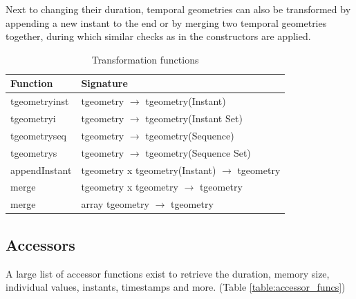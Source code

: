Next to changing their duration, temporal geometries can also be transformed by appending a new instant to the end or by merging two temporal geometries together, during which similar checks as in the constructors are applied.

\begin{table}[h!]
    \centering
    \begin{tabularx}{\textwidth}{|l|X|}
    \hline
    \textbf{Function}   & \textbf{Signature} \\ 
    \hline
    tgeometryinst       & tgeometry $\rightarrow$ tgeometry(Instant) \\
    \hline
    tgeometryi          & tgeometry $\rightarrow$ tgeometry(Instant Set) \\
    \hline
    tgeometryseq        & tgeometry $\rightarrow$ tgeometry(Sequence) \\
    \hline
    tgeometrys          & tgeometry $\rightarrow$ tgeometry(Sequence Set) \\
    \hline
    \hline
    appendInstant       & tgeometry x tgeometry(Instant) $\rightarrow$ tgeometry \\
    \hline
    merge               & tgeometry x tgeometry $\rightarrow$ tgeometry \\
    \hline
    merge               & array tgeometry $\rightarrow$ tgeometry \\
    \hline
    \end{tabularx}
    \caption{Transformation functions}
    \label{table:transformation_funcs}
\end{table}

\subsection{Accessors}
\label{section:accessors}

A large list of accessor functions exist to retrieve the duration, memory size, individual values, instants, timestamps and more. (Table \ref{table:accessor_funcs})

